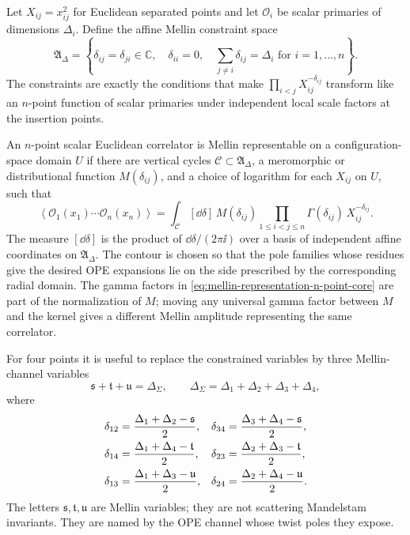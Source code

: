 Let \(X_{ij}=x_{ij}^2\) for Euclidean separated points and let
\(\mathcal O_i\) be scalar primaries of dimensions \(\Delta_i\).  Define the
affine Mellin constraint space
\begin{equation}
  \mathfrak A_{\Delta}
  =
  \left\{
    \delta_{ij}=\delta_{ji}\in\mathbb C,\quad
    \delta_{ii}=0,\quad
    \sum_{j\ne i}\delta_{ij}=\Delta_i
    \text{ for }i=1,\ldots,n
  \right\}.
  \label{eq:mellin-affine-constraint-space}
\end{equation}
The constraints are exactly the conditions that make
\(\prod_{i<j}X_{ij}^{-\delta_{ij}}\) transform like an \(n\)-point function
of scalar primaries under independent local scale factors at the insertion
points.

\begin{definition}
\label{def:scalar-mellin-representation}
An \(n\)-point scalar Euclidean correlator is Mellin representable on a
configuration-space domain \(U\) if there are vertical cycles
\(\mathcal C\subset\mathfrak A_\Delta\), a meromorphic or distributional
function \(M(\delta_{ij})\), and a choice of logarithm for each \(X_{ij}\) on
\(U\), such that
\begin{equation}
  \left\langle
    \mathcal O_1(x_1)\cdots\mathcal O_n(x_n)
  \right\rangle
  =
  \int_{\mathcal C}[\dd\delta]\,
  M(\delta_{ij})
  \prod_{1\le i<j\le n}
  \Gamma(\delta_{ij})\,X_{ij}^{-\delta_{ij}} .
  \label{eq:mellin-representation-n-point-core}
\end{equation}
The measure \([\dd\delta]\) is the product of \(\dd\delta/(2\pi\ii)\) over a
basis of independent affine coordinates on
\(\mathfrak A_\Delta\).  The contour is chosen so that the pole families whose
residues give the desired OPE expansions lie on the side prescribed by the
corresponding radial domain.  The gamma factors in
\eqref{eq:mellin-representation-n-point-core} are part of the normalization
of \(M\); moving any universal gamma factor between \(M\) and the kernel gives
a different Mellin amplitude representing the same correlator.
\end{definition}

For four points it is useful to replace the constrained variables by three
Mellin-channel variables
\[
  \mathfrak s+\mathfrak t+\mathfrak u
  =
  \Delta_\Sigma,
  \qquad
  \Delta_\Sigma=\Delta_1+\Delta_2+\Delta_3+\Delta_4,
\]
where
\begin{align}
  \delta_{12}&=\frac{\Delta_1+\Delta_2-\mathfrak s}{2},
  &
  \delta_{34}&=\frac{\Delta_3+\Delta_4-\mathfrak s}{2},
  \notag\\
  \delta_{14}&=\frac{\Delta_1+\Delta_4-\mathfrak t}{2},
  &
  \delta_{23}&=\frac{\Delta_2+\Delta_3-\mathfrak t}{2},
  \label{eq:mellin-four-point-delta-variables}\\
  \delta_{13}&=\frac{\Delta_1+\Delta_3-\mathfrak u}{2},
  &
  \delta_{24}&=\frac{\Delta_2+\Delta_4-\mathfrak u}{2}.
  \notag
\end{align}
The letters \(\mathfrak s,\mathfrak t,\mathfrak u\) are Mellin variables;
they are not scattering Mandelstam invariants.  They are named by the OPE
channel whose twist poles they expose.

